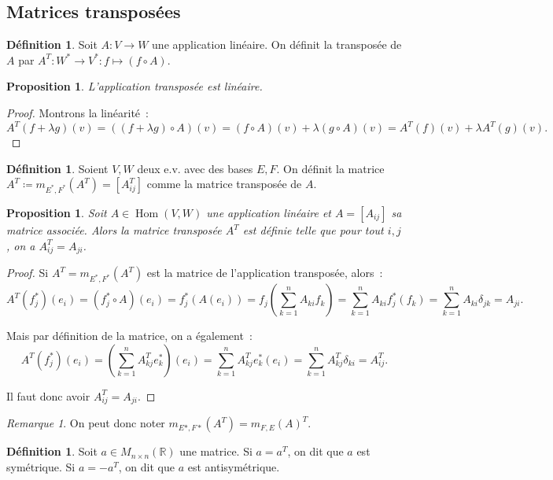 \documentclass{article}
\DeclareMathOperator{\Hom}{Hom}
\newcommand{\R}{\mathbb R}
\newcommand{\M}[3]{M_{#1 \times #2}(#3)}
\newtheorem{prp}[thm]{Proposition}
\theoremstyle{definition}
\newtheorem{déf}[thm]{Définition}
\theoremstyle{remark}
\newtheorem*{rmq}{Remarque}
\begin{document}
	\subsection{Matrices transposées}
		\begin{déf} Soit $A : V \to W$ une application linéaire. On définit la transposée de $A$ par $A^T : W^* \to V^* : f \mapsto (f \circ A)$. \end{déf}

		\begin{prp} L'application transposée est linéaire. \end{prp}

		\begin{proof} Montrons la linéarité~:
		\[A^T(f+\lambda g)(v) = ((f+\lambda g) \circ A)(v) = (f \circ A)(v) + \lambda (g \circ A)(v) = A^T(f)(v) + \lambda A^T(g)(v).\]
		\end{proof}

		\begin{déf} Soient $V, W$ deux e.v. avec des bases $E, F$. On définit la matrice $A^T \coloneqq m_{E^*, F^*}(A^T)  = [A^T_{ij}]$ comme la matrice transposée
		de $A$. \end{déf}

		\begin{prp} Soit $A \in \Hom(V, W)$ une application linéaire et $A = [A_{ij}]$ sa matrice associée. Alors la matrice transposée $A^T$ est définie telle que
		pour tout $i, j$, on a $A^T_{ij} = A_{ji}$. \end{prp}

		\begin{proof} Si $A^T = m_{E^*, F^*}(A^T)$ est la matrice de l'application transposée, alors~: \[A^T(f_j^*)(e_i) = (f_j^* \circ A)(e_i) = f_j^*(A(e_i))
		= f_j\left(\sum_{k=1}^nA_{ki}f_k\right) = \sum_{k=1}^nA_{ki}f_j^*(f_k) = \sum_{k=1}^nA_{ki}\delta_{jk} = A_{ji}.\]

		Mais par définition de la matrice, on a également~: \[A^T(f_j^*)(e_i) = \left(\sum_{k=1}^nA^T_{kj}e_k^*\right)(e_i) = \sum_{k=1}^nA^T_{kj}e_k^*(e_i)
		= \sum_{k=1}^nA^T_{kj}\delta_{ki} = A^T_{ij}.\]

		Il faut donc avoir $A^T_{ij} = A_{ji}$. \end{proof}

		\begin{rmq} On peut donc noter $m_{E*, F*}(A^T) = m_{F, E}(A)^T$. \end{rmq}

		\begin{déf} Soit $a \in \M nn\R$ une matrice. Si $a=a^T$, on dit que $a$ est symétrique. Si $a=-a^T$, on dit que $a$ est antisymétrique. \end{déf}
\end{document}
